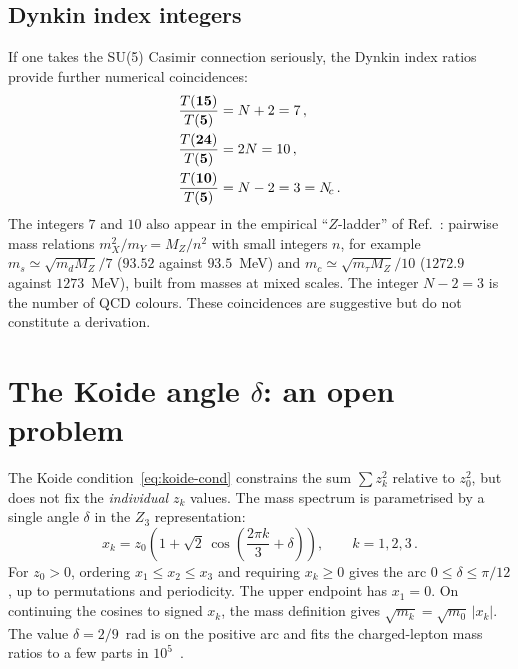 \documentclass[11pt,a4paper]{article}
\begin{document}
\subsection{Dynkin index integers}

If one takes the SU(5) Casimir connection seriously, the
Dynkin index ratios provide further numerical coincidences:
\begin{align}
  \frac{T(\mathbf{15})}{T(\mathbf{5})} &= N+2 = 7\,,
  \label{eq:dyn-7} \\
  \frac{T(\mathbf{24})}{T(\mathbf{5})} &= 2N = 10\,,
  \label{eq:dyn-10} \\
  \frac{T(\mathbf{10})}{T(\mathbf{5})} &= N-2 = 3 = N_{\!c}\,.
  \label{eq:dyn-3}
\end{align}
The integers $7$ and $10$ also appear in the empirical
``$Z$-ladder'' of Ref.~\cite{RiveroZladder}: pairwise mass relations
$m_X^2/m_Y = M_Z/n^2$ with small integers $n$, for example
$m_s \simeq \sqrt{m_d M_Z}/7$ ($93.52$ against $93.5$~MeV) and
$m_c \simeq \sqrt{m_\tau M_Z}/10$ ($1272.9$ against $1273$~MeV),
built from masses at mixed scales.  The integer $N-2 = 3$ is the
number of QCD colours.  These coincidences are suggestive but do not
constitute a derivation.

\section{The Koide angle \texorpdfstring{$\delta$}{delta}: an open problem}
\label{sec:angle}

The Koide condition~\eqref{eq:koide-cond} constrains the sum
$\sum z_k^2$ relative to $z_0^2$, but does not fix the
\emph{individual} $z_k$ values.  The mass spectrum is
parametrised by a single angle $\delta$ in the $Z_3$
representation:
\begin{equation}
  x_k = z_0\!\left(1+\sqrt{2}\,
  \cos\!\left(\frac{2\pi k}{3}+\delta\right)\right),
  \qquad k = 1,2,3\,.
  \label{eq:z3}
\end{equation}
For $z_0>0$, ordering $x_1\leq x_2\leq x_3$ and requiring $x_k\geq0$
gives the arc $0\leq\delta\leq\pi/12$, up to permutations and
periodicity.  The upper endpoint has $x_1=0$.  On continuing the
cosines to signed $x_k$, the mass definition gives
$\sqrt{m_k}=\sqrt{m_0}\,|x_k|$.  The value $\delta=2/9$~rad is on
the positive arc and fits the charged-lepton mass ratios to a few
parts in $10^5$~\cite{Brannen2006}.
\end{document}

